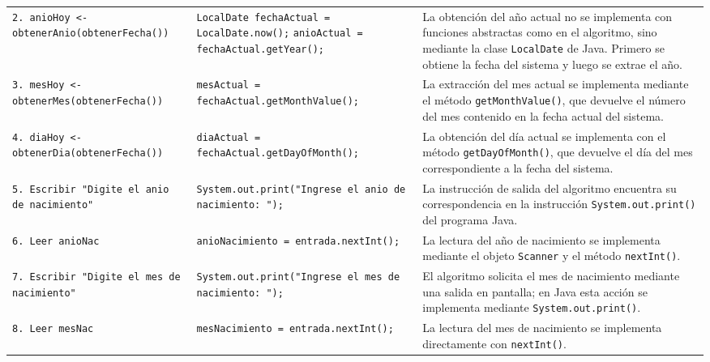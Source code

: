 \documentclass[12pt,twoside]{book}
\begin{document}
\begin{landscape}
\begin{longtable}{p{6cm} p{6cm} p{7cm}}
							
							\texttt{2. anioHoy <- obtenerAnio(obtenerFecha())}
							&
							\texttt{LocalDate fechaActual = LocalDate.now();} \newline
							\texttt{anioActual = fechaActual.getYear();}
							&
							La obtención del año actual no se implementa con funciones abstractas como en el algoritmo, sino mediante la clase \texttt{LocalDate} de Java. Primero se obtiene la fecha del sistema y luego se extrae el año. \\
							
							
							\texttt{3. mesHoy <- obtenerMes(obtenerFecha())}
							&
							\texttt{mesActual = fechaActual.getMonthValue();}
							&
							La extracción del mes actual se implementa mediante el método \texttt{getMonthValue()}, que devuelve el número del mes contenido en la fecha actual del sistema. \\
							
							
							\texttt{4. diaHoy <- obtenerDia(obtenerFecha())}
							&
							\texttt{diaActual = fechaActual.getDayOfMonth();}
							&
							La obtención del día actual se implementa con el método \texttt{getDayOfMonth()}, que devuelve el día del mes correspondiente a la fecha del sistema. \\
							
							
							\texttt{5. Escribir "Digite el anio de nacimiento"}
							&
							\texttt{System.out.print("Ingrese el anio de nacimiento: ");}
							&
							La instrucción de salida del algoritmo encuentra su correspondencia en la instrucción \texttt{System.out.print()} del programa Java. \\
							
							
							\texttt{6. Leer anioNac}
							&
							\texttt{anioNacimiento = entrada.nextInt();}
							&
							La lectura del año de nacimiento se implementa mediante el objeto \texttt{Scanner} y el método \texttt{nextInt()}. \\
							
							
							\texttt{7. Escribir "Digite el mes de nacimiento"}
							&
							\texttt{System.out.print("Ingrese el mes de nacimiento: ");}
							&
							El algoritmo solicita el mes de nacimiento mediante una salida en pantalla; en Java esta acción se implementa mediante \texttt{System.out.print()}. \\
							
							
							\texttt{8. Leer mesNac}
							&
							\texttt{mesNacimiento = entrada.nextInt();}
							&
							La lectura del mes de nacimiento se implementa directamente con \texttt{nextInt()}. \\
							

\end{longtable}
\end{landscape}
\end{document}
